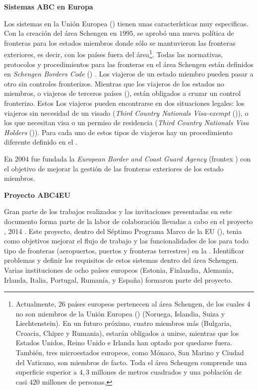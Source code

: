 \medskip
\textbf{Sistemas ABC en Europa} 
\medskip

Los sistemas  en la Unión Europea () tienen unas características muy especificas. Con la creación del área \Gls{Schengen} en $1995$, se aprobó una nueva política de fronteras para los estados miembros donde sólo se mantuvieron las fronteras exteriores, es decir, con los países fuera del área\footnote{Actualmente, $26$ países europeos pertenecen al área \Gls{Schengen}, de los cuales $4$ no son miembros de la Unión Europea () (Noruega, Islandia, Suiza y Liechtenstein). En un futuro próximo, cuatro miembros más (Bulgaria, Croacia, Chipre y Rumania), estarán obligados a unirse, mientras que los Estados Unidos, Reino Unido e Irlanda han optado por quedarse fuera. También, tres microestados europeos, como Mónaco, San Marino y Ciudad del Vaticano, son miembros de facto. Toda el área \Gls{Schengen} comprende una superficie superior a $4,3$ millones de metros cuadrados y una población de casi $420$ millones de personas,}. Todas las normativas, protocolos y procedimientos para las fronteras en el área \Gls{Schengen} están definidos en \textit{Schengen Borders Code} () \cite{SBCode2016}. Los viajeros de un estado miembro pueden pasar a otro sin controles fronterizos. Mientras que los viajeros de los estados no miembros, o viajeros de terceros países (), están obligados a cruzar un control fronterizo. Estos Los viajeros pueden encontrarse en dos situaciones legales: los viajeros sin necesidad de un visado (\textit{Third Country Nationals Visa-exempt} ()), o los que necesitan \gls{visa} o un permiso de residencia (\textit{Third Country Nationals Visa Holders} ()). Para cada uno de estos tipos de viajeros hay un procedimiento diferente definido en el .

En $2004$ fue fundada la \textit{European Border and Coast Guard Agency} (\Gls{frontex} \cite{FRONTEXOnLine}) con el objetivo de mejorar la gestión de las fronteras exteriores de los estado miembros. 

\medskip
\textbf{Proyecto ABC4EU} 
\medskip
 
Gran parte de los trabajos realizados y las invitaciones presentadas en este documento forma parte de la labor de colaboración llevadas a cabo en el proyecto , 2014 \cite{ABC4EUOnline}. Este proyecto, dentro del Séptimo Programa Marco de la \gls{EU} (), tenia como objetivos mejorar el flujo de trabajo y las funcionalidades de los  para todo tipo de fronteras (aeropuertos, puertos y fronteras terrestres) en la . Identificar problemas y definir los requisitos de estos sistemas dentro del área \Gls{Schengen}. Varias instituciones de ocho países europeos (Estonia, Finlandia, Alemania, Irlanda, Italia, Portugal, Rumanía, y España) formaron parte del proyecto.

